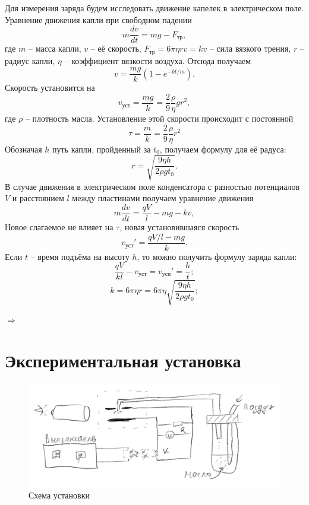 \documentclass[a4paper, 12pt]{article}
\begin{document}
Для измерения заряда будем исследовать движение капелек в электрическом поле. Уравнение движения капли при свободном падении
\begin{equation}
m \dfrac{dv}{dt}=mg-F_{\text{тр}},
\end{equation}
где $m$ -- масса капли, $v$ -- её скорость, $F_{\text{тр}}=6\pi \eta rv = kv$ -- сила вязкого трения, $r$ -- радиус капли, $\eta$ -- коэффициент вязкости воздуха. Отсюда получаем 
\begin{equation}
v = \dfrac{mg}{k}\left(1 - e^{-kt/m}\right).
\end{equation}
Скорость установится на
$$
v_{\text{уст}}=\dfrac{mg}{k}=\dfrac{2}{9}\dfrac{\rho}{\eta}gr^2,
$$
где $\rho$ -- плотность масла. Установление этой скорости происходит с постоянной
$$
\tau = \dfrac{m}{k}=\dfrac{2}{9}\dfrac{\rho}{\eta}r^2
$$
Обозначая $h$ путь капли, пройденный за $t_0$, получаем формулу для её радуса:
\begin{equation}
r = \sqrt{\dfrac{9\eta h}{2\rho gt_0}}.
\end{equation}
В случае движения в электрическом поле конденсатора с разностью потенциалов $V$ и расстоянием $l$ между пластинами получаем уравнение движения
\begin{equation}
m \dfrac{dv}{dt}=\dfrac{qV}{l}-mg-kv,
\end{equation}
Новое слагаемое не влияет на $\tau$, новая установившаяся скорость
$$
v_{\text{уст}}'=\dfrac{qV/l - mg}{k}.
$$
Если $t$ -- время подъёма на высоту $h$, то можно получить формулу заряда капли:
$$
\dfrac{qV}{kl}-v_{\text{уст}}=v_{\text{уси}}'=\dfrac{h}{t};
$$
$$
k=6\pi \eta r  = 6\pi \eta  \sqrt{\dfrac{9\eta h}{2\rho gt_0}};
$$
\begin{center}
$\Rightarrow$ 
\end{center}

\section{Экспериментальная установка}

\begin{figure}[H]
    \centering
    \includegraphics[width=1\textwidth]{set}
    \caption{Схема установки}
    \label{fig:set}
\end{figure}
\end{document}
